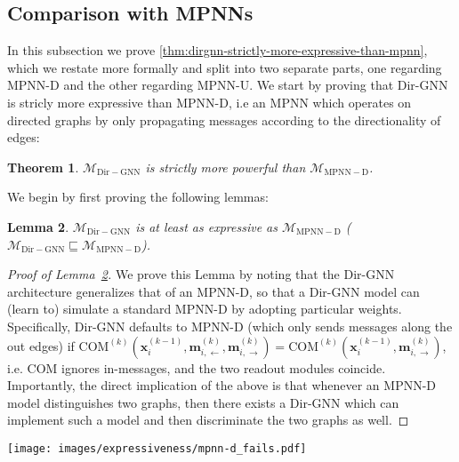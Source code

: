 \documentclass{article}
\newcommand{\inp}{\leftarrow}
\newcommand{\out}{\rightarrow}
\newcommand\oursacro{Dir-GNN}
\newcommand\m{m}
\theoremstyle{plain}
\newtheorem{theorem}{Theorem}[section]
\newtheorem{lemma}[theorem]{Lemma}
\theoremstyle{definition}
\theoremstyle{remark}
\begin{document}
\subsection{Comparison with MPNNs}

In this subsection we prove \cref{thm:dirgnn-strictly-more-expressive-than-mpnn}, which we restate more formally and split into two separate parts, one regarding MPNN-D and the other regarding MPNN-U. We start by proving that \oursacro{} is stricly more expressive than MPNN-D, i.e an MPNN which operates on directed graphs by only propagating messages according to the directionality of edges:

\begin{theorem}\label{thm:dirgnn-strictly-more-expressive-than-mpnn-d}
    $\mathcal{M}_\mathrm{\oursacro{}}$ is strictly more powerful than $\mathcal{M}_\mathrm{MPNN-D}$.
\end{theorem}

We begin by first proving the following lemmas:

\begin{lemma}\label{lemma:dirgnn-at-least-as-expressive-as-mpnn-d}
    $\mathcal{M}_\mathrm{\oursacro{}}$ is at least as expressive as $\mathcal{M}_\mathrm{MPNN-D}$ ($\mathcal{M}_\mathrm{\oursacro{}} \sqsubseteq \mathcal{M}_\mathrm{MPNN-D}$). 
\end{lemma}

\begin{proof}[Proof of Lemma~\ref{lemma:dirgnn-at-least-as-expressive-as-mpnn-d}]
    We prove this Lemma by noting that the \oursacro{} architecture generalizes that of an MPNN-D, so that a \oursacro{} model can (learn to) simulate a standard MPNN-D by adopting particular weights. Specifically, \oursacro{} defaults to MPNN-D (which only sends messages along the out edges) if $\mathrm{COM}^{(k)}\left(\mathbf{x}_{i}^{(k-1)},\mathbf{\m}^{(k)}_{i,\inp}, \mathbf{\m}^{(k)}_{i,\out}\right) = \mathrm{COM}^{(k)}\left(\mathbf{x}_{i}^{(k-1)}, \mathbf{\m}^{(k)}_{i,\out}\right)$, i.e. $\mathrm{COM}$ ignores in-messages, and the two readout modules coincide. Importantly, the direct implication of the above is that whenever an MPNN-D model distinguishes two graphs, then there exists a \oursacro{} which can implement such a model and then discriminate the two graphs as well.
\end{proof}

\begin{figure*}
    \centering
    \texttt{[image: images/expressiveness/mpnn-d\_fails.pdf]}
    \vspace{3mm}
    \caption{Two non-isomorphic directed graphs that cannot be distinguished by any MPNN-D model but can be distinguished by \oursacro{}.}
    \label{fig:mpnn-d_fails}
\end{figure*}
\end{document}
